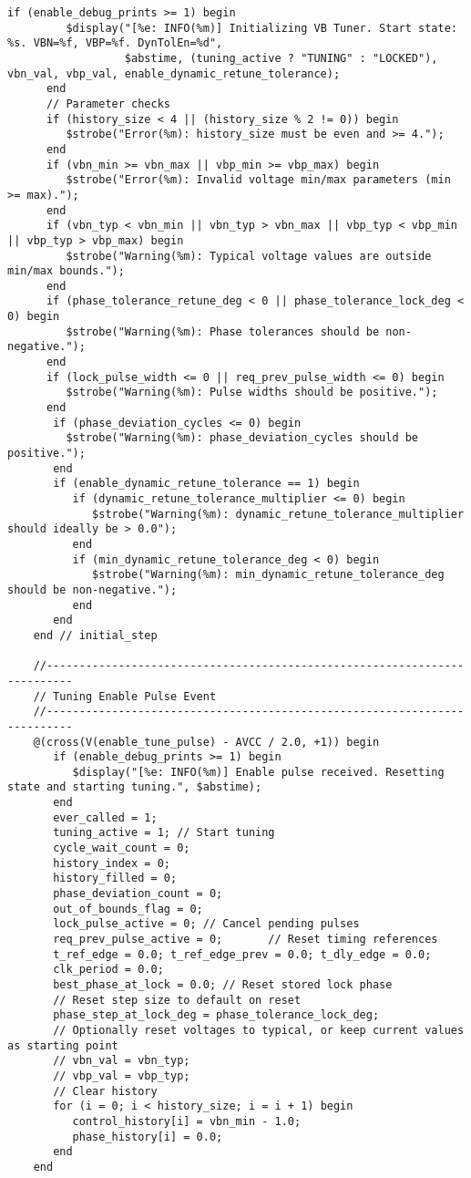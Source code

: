 \begin{lstlisting}[caption={Verilog-A Generic Vb Tuner Implementation}]
      if (enable_debug_prints >= 1) begin
         $display("[%e: INFO(%m)] Initializing VB Tuner. Start state: %s. VBN=%f, VBP=%f. DynTolEn=%d",
                  $abstime, (tuning_active ? "TUNING" : "LOCKED"), vbn_val, vbp_val, enable_dynamic_retune_tolerance);
      end
      // Parameter checks
      if (history_size < 4 || (history_size % 2 != 0)) begin
         $strobe("Error(%m): history_size must be even and >= 4.");
      end
      if (vbn_min >= vbn_max || vbp_min >= vbp_max) begin
         $strobe("Error(%m): Invalid voltage min/max parameters (min >= max).");
      end
      if (vbn_typ < vbn_min || vbn_typ > vbn_max || vbp_typ < vbp_min || vbp_typ > vbp_max) begin
         $strobe("Warning(%m): Typical voltage values are outside min/max bounds.");
      end
      if (phase_tolerance_retune_deg < 0 || phase_tolerance_lock_deg < 0) begin
         $strobe("Warning(%m): Phase tolerances should be non-negative.");
      end
      if (lock_pulse_width <= 0 || req_prev_pulse_width <= 0) begin
         $strobe("Warning(%m): Pulse widths should be positive.");
      end
       if (phase_deviation_cycles <= 0) begin
         $strobe("Warning(%m): phase_deviation_cycles should be positive.");
       end
       if (enable_dynamic_retune_tolerance == 1) begin
          if (dynamic_retune_tolerance_multiplier <= 0) begin
             $strobe("Warning(%m): dynamic_retune_tolerance_multiplier should ideally be > 0.0");
          end
          if (min_dynamic_retune_tolerance_deg < 0) begin
             $strobe("Warning(%m): min_dynamic_retune_tolerance_deg should be non-negative.");
          end
       end
    end // initial_step

    //--------------------------------------------------------------------------
    // Tuning Enable Pulse Event
    //--------------------------------------------------------------------------
    @(cross(V(enable_tune_pulse) - AVCC / 2.0, +1)) begin
       if (enable_debug_prints >= 1) begin
          $display("[%e: INFO(%m)] Enable pulse received. Resetting state and starting tuning.", $abstime);
       end
       ever_called = 1;
       tuning_active = 1; // Start tuning
       cycle_wait_count = 0;
       history_index = 0;
       history_filled = 0;
       phase_deviation_count = 0;
       out_of_bounds_flag = 0;
       lock_pulse_active = 0; // Cancel pending pulses
       req_prev_pulse_active = 0;       // Reset timing references
       t_ref_edge = 0.0; t_ref_edge_prev = 0.0; t_dly_edge = 0.0;
       clk_period = 0.0;
       best_phase_at_lock = 0.0; // Reset stored lock phase
       // Reset step size to default on reset
       phase_step_at_lock_deg = phase_tolerance_lock_deg;
       // Optionally reset voltages to typical, or keep current values as starting point
       // vbn_val = vbn_typ;
       // vbp_val = vbp_typ;
       // Clear history
       for (i = 0; i < history_size; i = i + 1) begin
          control_history[i] = vbn_min - 1.0;
          phase_history[i] = 0.0;
       end
    end


\end{lstlisting}

